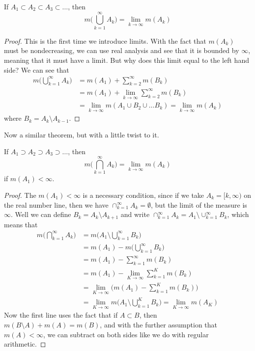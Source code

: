   \begin{theorem}
    If $A_1 \subset A_2 \subset A_3 \subset \ldots$, then 
    \begin{equation}
      m\bigg( \bigcup_{k=1}^\infty A_k \bigg) = \lim_{k \rightarrow \infty} m(A_k)
    \end{equation}
  \end{theorem}
  \begin{proof}
    This is the first time we introduce limits. With the fact that $m(A_k)$ must be nondecreasing, we can use real analysis and see that it is bounded by $\infty$, meaning that it must have a limit. But why does this limit equal to the left hand side? We can see that 
    \begin{align}
      m\bigg( \bigcup_{k=1}^\infty A_k \bigg) & = m(A_1) + \sum_{k=2}^\infty m(B_k) \\
      & = m(A_1) + \lim_{k \rightarrow \infty} \sum_{k=2}^\infty m(B_k) \\
      & = \lim_{k \rightarrow \infty} m(A_1 \cup B_2 \cup \ldots B_k)  = \lim_{k \rightarrow \infty} m(A_k) 
    \end{align}
    where $B_k = A_k \setminus A_{k-1}$. 
  \end{proof}

  Now a similar theorem, but with a little twist to it. 

  \begin{theorem}
    If $A_1 \supset A_2 \supset A_3 \supset \ldots$, then 
    \begin{equation}
      m\bigg( \bigcap_{k=1}^\infty A_k \bigg) = \lim_{k \rightarrow \infty} m(A_k)
    \end{equation}
    if $m(A_1) < \infty$. 
  \end{theorem}
  \begin{proof}
    The $m(A_1) < \infty$ is a necessary condition, since if we take $A_k = [k, \infty)$ on the real number line, then we have $\cap_{k=1}^\infty A_k = \emptyset$, but the limit of the measure is $\infty$. Well we can define $B_k = A_k \setminus A_{k+1}$ and write $\cap_{k=1}^\infty A_k = A_1 \setminus \cup_{k=1}^\infty B_k$, which means that 
    \begin{align}
      m\bigg( \bigcap_{k=1}^\infty A_k \bigg) & = m\bigg( A_1 \setminus \bigcup_{k=1}^\infty B_k \bigg) \\
      & = m(A_1) - m\bigg( \bigcup_{k=1}^\infty B_k\bigg) \\
      & = m(A_1) - \sum_{k=1}^\infty m(B_k) \\
      & = m(A_1) - \lim_{K \rightarrow \infty} \sum_{k=1}^K m(B_k) \\
      & = \lim_{K \rightarrow \infty} \bigg( m(A_1) - \sum_{k=1}^K m(B_k) \bigg) \\
      & = \lim_{K \rightarrow \infty} m \bigg( A_1 \setminus \bigcup_{k=1}^K B_k \bigg) = \lim_{K \rightarrow \infty} m(A_K)
    \end{align}
    Now the first line uses the fact that if $A \subset B$, then $m(B \setminus A) + m(A) = m(B)$, and with the further assumption that $m(A) < \infty$, we can subtract on both sides like we do with regular arithmetic. 
  \end{proof}

